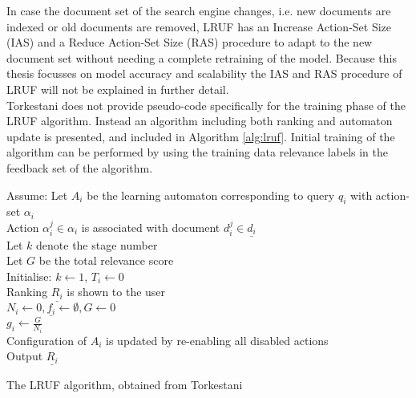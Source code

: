 In case the document set of the search engine changes, i.e. new documents are indexed or old documents are removed, LRUF has an Increase Action-Set Size (IAS) and a Reduce Action-Set Size (RAS) procedure to adapt to the new document set without needing a complete retraining of the model. Because this thesis focusses on model accuracy and scalability the IAS and RAS procedure of LRUF will not be explained in further detail.\\

Torkestani \cite{Torkestani2012b} does not provide pseudo-code specifically for the training phase of the LRUF algorithm. Instead an algorithm including both ranking and automaton update is presented, and included in Algorithm \ref{alg:lruf}. Initial training of the algorithm can be performed by using the training data relevance labels in the feedback set of the algorithm.

\begin{algorithm}
 Assume:
 	Let $A_i$ be the learning automaton corresponding to query $q_i$ with action-set $\alpha_i$\\
 	Action $\alpha_i^j \in \alpha_i$ is associated with document $d_i^j \in \underline{d_i}$\\
 	Let $k$ denote the stage number\\
 	Let $G$ be the total relevance score\\
 Initialise: $k\leftarrow 1$, $T_i\leftarrow 0$\\
 Ranking $\underline{R_i}$ is shown to the user\\
 $N_i\leftarrow 0,\underline{f_i}\leftarrow \emptyset,G\leftarrow 0$\\
 $g_i \leftarrow \frac{G}{N_i}$\\
 Configuration of $A_i$ is updated by re-enabling all disabled actions\\
 Output $\underline{R_i}$
 \caption{The LRUF algorithm, obtained from Torkestani \cite{Torkestani2012b}}
 \label{alg:lruf}
\end{algorithm}
